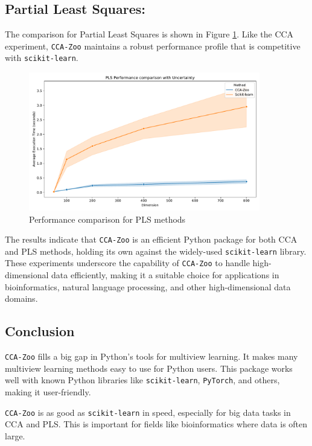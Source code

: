\subsection{Partial Least Squares:}
The comparison for Partial Least Squares is shown in Figure \ref{fig:pls_benchmark}.
Like the CCA experiment, \texttt{CCA-Zoo} maintains a robust performance profile that is competitive with \texttt{scikit-learn}.

\begin{figure}[h]
    \centering
    \includegraphics[width=0.9\textwidth]{figures/PLS_Speed_Benchmark}
    \caption{Performance comparison for PLS methods}
    \label{fig:pls_benchmark}
\end{figure}

The results indicate that \texttt{CCA-Zoo} is an efficient Python package for both CCA and PLS methods, holding its own against the widely-used \texttt{scikit-learn} library.
These experiments underscore the capability of \texttt{CCA-Zoo} to handle high-dimensional data efficiently, making it a suitable choice for applications in bioinformatics, natural language processing, and other high-dimensional data domains.

\subsection{Conclusion}

\texttt{CCA-Zoo} fills a big gap in Python's tools for multiview learning.
It makes many multiview learning methods easy to use for Python users.
This package works well with known Python libraries like \texttt{scikit-learn}, \texttt{PyTorch}, and others, making it user-friendly.

\texttt{CCA-Zoo} is as good as \texttt{scikit-learn} in speed, especially for big data tasks in CCA and PLS. This is important for fields like bioinformatics where data is often large.

